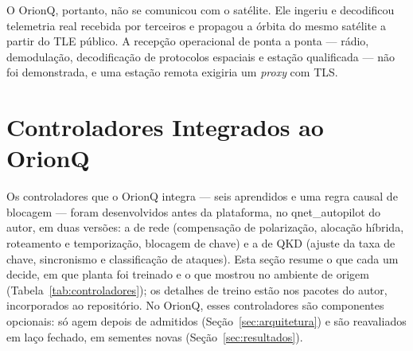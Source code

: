 \documentclass[12pt]{article}
\begin{document}
O OrionQ, portanto, não se comunicou com o satélite. Ele ingeriu e decodificou
telemetria real recebida por terceiros e propagou a órbita do mesmo satélite a
partir do TLE público. A recepção operacional de ponta a ponta --- rádio,
demodulação, decodificação de protocolos espaciais e estação qualificada --- não
foi demonstrada, e uma estação remota exigiria um \textit{proxy} com TLS.

\section{Controladores Integrados ao OrionQ}
\label{sec:modelos}

Os controladores que o OrionQ integra --- seis aprendidos e uma regra causal de
blocagem --- foram desenvolvidos antes da plataforma, no qnet\_autopilot do autor, em duas versões: a de rede
(compensação de polarização, alocação híbrida, roteamento e temporização,
blocagem de chave) e a de QKD (ajuste da taxa de chave, sincronismo e
classificação de ataques). Esta seção resume o que cada um decide, em que planta
foi treinado e o que mostrou no ambiente de origem (Tabela~\ref{tab:controladores});
os detalhes de treino estão nos pacotes do autor, incorporados ao repositório.
No OrionQ, esses controladores são componentes opcionais: só agem depois de
admitidos (Seção~\ref{sec:arquitetura}) e são reavaliados em laço fechado, em
sementes novas (Seção~\ref{sec:resultados}).
\end{document}

